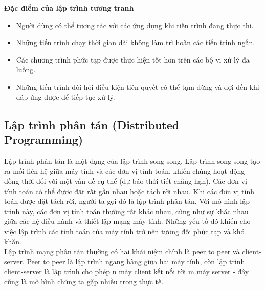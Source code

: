 \documentclass[10pt, a4paper]{article}
\begin{document}
\textbf{Đặc điểm của lập trình tương tranh}
\begin{itemize}
\item Người dùng có thể tương tác với các ứng dụng khi tiến trình đang thực thi.
\item Những tiến trình chạy thời gian dài không làm trì hoãn các tiến trình ngắn.
\item Các chương trình phức tạp được thực hiện tốt hơn trên các bộ vi xử lý đa luồng.
\item Những tiến trình đòi hỏi điều kiện tiên quyết có thể tạm dừng và đợi đến khi đáp ứng được để tiếp tục xử lý.
\end{itemize}

\subsection{Lập trình phân tán (Distributed Programming)}

Lập trình phân tán là một dạng của lập trình song song. Lâp trình song song tạo ra mối liên hệ giữa máy tính và các đơn vị tính toán, khiến chúng hoạt động đồng thời đối với một vấn đề cụ thể (dự báo thời tiết chẳng hạn). Các đơn vị tính toán có thể được đặt rất gần nhau hoặc tách rời nhau. Khi các đơn vị tính toán được đặt tách rời, người ta gọi đó là lập trình phân tán. Với mô hình lập trình này, các đơn vị tính toán thường rất khác nhau, cũng như sự khác nhau giữa các hệ điều hành và thiết lập mạng máy tính. Những yếu tố đó khiến cho việc lập trình các tính toán của máy tính trở nên tương đối phức tạp và khó khăn. \\

Lập trình mạng phân tán thường có hai khái niệm chính là peer to peer và client-server. Peer to peer là lập trình ngang hàng giữa hai máy tính, còn lập trình client-server là lập trình cho phép n máy client kết nối tời m máy server - đây cũng là mô hình chúng ta gặp nhiều trong thực tế.
\end{document}
